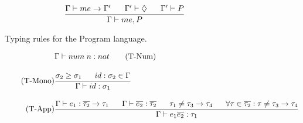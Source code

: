 \begin{figure}[htb]
\begin{align*}
&\frac
{\Gamma \vdash me \rightarrow \Gamma' \;\;\;\;\;\; \Gamma' \vdash \Diamond \;\;\;\;\;\; \Gamma' \vdash P}
{\Gamma \vdash me, P}
\end{align*}
\caption[Typing Rules: Program Language]{Typing rules for the Program language. \label{fig:TypeRulesProgram}}
\end{figure}

\begin{figure}[htb]
\begin{align*}
&\Gamma \vdash num \; n : nat \tag{T-Num}
\\[1em]
\tag{T-Mono}
&\frac{\sigma_{2} \geq \sigma_{1} \longspace id:\sigma_{2} \in \Gamma}{\Gamma \vdash id:\sigma_{1}}
\\[1em]
\tag{T-App}
&\frac{\Gamma \vdash e_{1}:\overline{\tau_{2}} \rightarrow \tau_{1} \longspace \Gamma \vdash \overline{e_{2}}:\overline{\tau_{2}} \longspace \tau_{1} \neq \tau_{3} \rightarrow \tau_{4} \longspace \forall \tau \in \overline{\tau_{2}} : \tau \neq \tau_{3} \rightarrow \tau_{4}}
{\Gamma \vdash e_{1} \overline{e_{2}}:\tau_{1}}
\\[1em]
%
%

\end{align*}
\end{figure}
